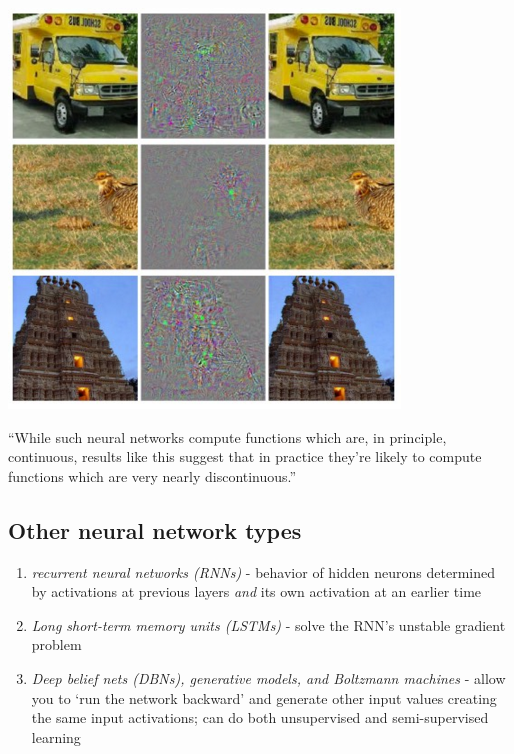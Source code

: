 \documentclass[12pt]{article}
\begin{document}
\includegraphics[scale=0.8]{adversarial.png}

``While such neural networks compute functions which are, in principle, continuous, results like this suggest that in practice they're likely to compute functions which are very nearly discontinuous.''

\subsection*{Other neural network types}

\begin{enumerate}
\item \textit{recurrent neural networks (RNNs)} - behavior of hidden neurons determined by activations at previous layers \textit{and} its own activation at an earlier time
\item \textit{Long short-term memory units (LSTMs)} - solve the RNN's unstable gradient problem
\item \textit{Deep belief nets (DBNs), generative models, and Boltzmann machines} - allow you to `run the network backward' and generate other input values creating the same input activations; can do both unsupervised and semi-supervised learning
\end{enumerate}
\end{document}
